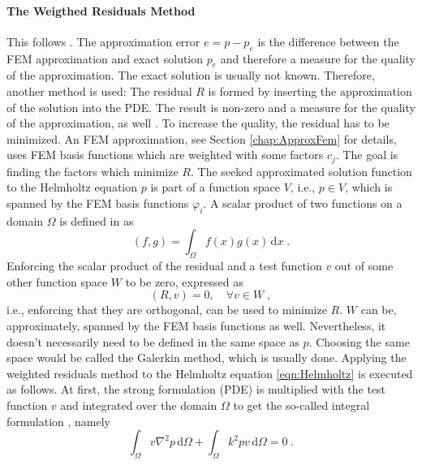 \documentclass[%
  a4paper,oneside,%
  11pt,%
  smallchapters,
  style=printdev,
  extramargin,
  green,%
  rgb, <cmyk>
  ]{tubsbook}
\begin{document}
\paragraph{The Weigthed Residuals Method}
This follows \cite[p.146 ff.]{langtangen2019}. The approximation error $e = p - p_e$ is the difference between the FEM approximation and exact solution $p_e$ and therefore a measure for the quality of the approximation. The exact solution is usually not known. Therefore, another method is used: The residual $R$ is formed by inserting the approximation of the solution into the PDE. The result is non-zero and a measure for the quality of the approximation, as well \cite{langtangen2019}. To increase the quality, the residual has to be minimized. 
An FEM approximation, see Section \ref{chap:ApproxFem} for details, uses FEM basis functions which are weighted with some factors $c_j$. The goal is finding the factors which minimize $R$. The seeked approximated solution function to the Helmholtz equation $p$ is part of a function space $V$, i.e., $p \in V$, which is spanned by the FEM basis functions $\varphi_i$. A scalar product of two functions on a domain $\Omega$ is defined in \cite[p.145]{langtangen2019} as 
\begin{equation}
(f,g) = \int_{\Omega}f(x) g(x) \, \mathrm{d}x \;.
\end{equation}
Enforcing the scalar product of the residual and a test function $v$ out of some other function space $W$ to be zero, expressed as
\begin{equation}
(R,v) = 0, \quad \forall v \in W \;,
\end{equation}
i.e., enforcing that they are orthogonal, can be used to minimize $R$. $W$ can be, approximately, spanned by the FEM basis functions as well. Nevertheless, it doesn't necessarily need to be defined in the same space as $p$. Choosing the same space would be called the Galerkin method, which is usually done. Applying the weighted residuals method to the Helmholtz equation \eqref{eqn:Helmholtz} is executed as follows.
At first, the strong formulation (PDE) is multiplied with the test function $v$ and integrated over the domain $\Omega$ to get the so-called integral formulation \cite{langtangen2019}, namely
\begin{equation}
\int_{\Omega} v \nabla^2 p \,\mathrm{d}\Omega + \int_{\Omega} k^2 pv \,\mathrm{d}\Omega = 0 \;.
\label{eqn:IntForm}
\end{equation}
%
\end{document}
